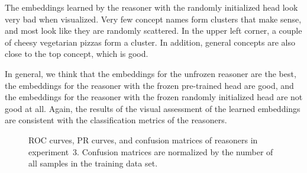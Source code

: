 The embeddings learned by the reasoner with the randomly initialized head look very bad when visualized.
Very few concept names form clusters that make sense, and most look like they are randomly scattered.
In the upper left corner, a couple of cheesy vegetarian pizzas form a cluster.
In addition, general concepts are also close to the top concept, which is good.

In general, we think that the embeddings for the unfrozen reasoner are the best, the embeddings for the reasoner with the frozen pre-trained head are good, and the embeddings for the reasoner with the frozen randomly initialized head are not good at all.
Again, the results of the visual assessment of the learned embeddings are consistent with the classification metrics of the reasoners.

\begin{figure}
\caption{
ROC curves, PR curves, and confusion matrices of reasoners in experiment~3.
Confusion matrices are normalized by the number of all samples in the training data set.
}
\label{fig:ex4-vs}
\end{figure}

